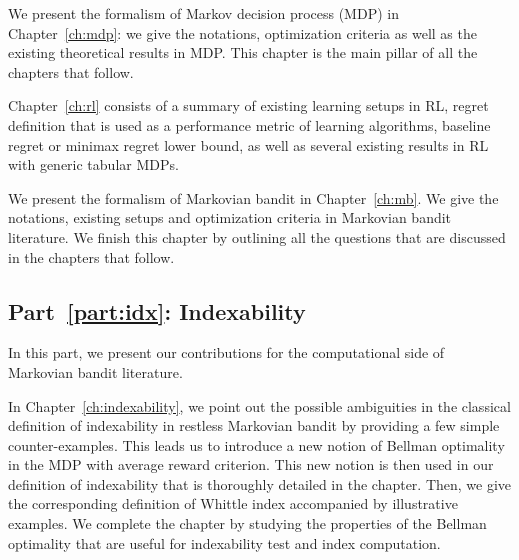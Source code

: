 We present the formalism of Markov decision process (MDP) in Chapter~\ref{ch:mdp}: we give the notations, optimization criteria as well as the existing theoretical results in MDP.
This chapter is the main pillar of all the chapters that follow.

Chapter~\ref{ch:rl} consists of a summary of existing learning setups in RL, regret definition that is used as a performance metric of learning algorithms, baseline regret or minimax regret lower bound, as well as several existing results in RL with generic tabular MDPs.

We present the formalism of Markovian bandit in Chapter~\ref{ch:mb}. We give the notations, existing setups and optimization criteria in Markovian bandit literature.
We finish this chapter by outlining all the questions that are discussed in the chapters that follow.

\subsection{Part~{\ref{part:idx}}: Indexability}

In this part, we present our contributions for the computational side of Markovian bandit literature.

In Chapter~\ref{ch:indexability}, we point out the possible ambiguities in the classical definition of indexability in restless Markovian bandit by providing a few simple counter-examples.
This leads us to introduce a new notion of Bellman optimality in the MDP with average reward criterion.
This new notion is then used in our definition of indexability that is thoroughly detailed in the chapter.
Then, we give the corresponding definition of Whittle index accompanied by illustrative examples.
We complete the chapter by studying the properties of the Bellman optimality that are useful for indexability test and index computation.

